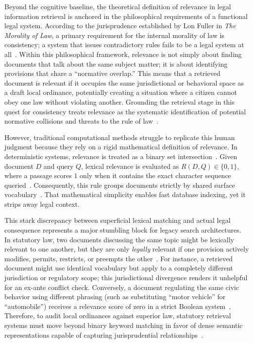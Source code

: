     Beyond the cognitive baseline, the theoretical definition of relevance in legal information retrieval is anchored in the philosophical requirements of a functional legal system. According to the jurisprudence established by Lon Fuller in \textit{The Morality of Law}, a primary requirement for the internal morality of law is consistency; a system that issues contradictory rules fails to be a legal system at all~\cite{fuller1964the}. Within this philosophical framework, relevance is not simply about finding documents that talk about the same subject matter; it is about identifying provisions that share a ``normative overlap.'' This means that a retrieved document is relevant if it occupies the same jurisdictional or behavioral space as a draft local ordinance, potentially creating a situation where a citizen cannot obey one law without violating another. Grounding the retrieval stage in this quest for consistency treats relevance as the systematic identification of potential normative collisions and threats to the rule of law~\cite{fuller1964the}.

    However, traditional computational methods struggle to replicate this human judgment because they rely on a rigid mathematical definition of relevance. In deterministic systems, relevance is treated as a binary set intersection~\cite{blair1985an}. Given document $D$ and query $Q$, lexical relevance is evaluated as $R(D,Q) \in \{0,1\}$, where a passage scores $1$ only when it contains the exact character sequence queried~\cite{opijnen2017on}. Consequently, this rule groups documents strictly by shared surface vocabulary~\cite{blair1985an}. That mathematical simplicity enables fast database indexing, yet it strips away legal context.

    This stark discrepancy between superficial lexical matching and actual legal consequence represents a major stumbling block for legacy search architectures. In statutory law, two documents discussing the same topic might be lexically relevant to one another, but they are only \textit{legally} relevant if one provision actively modifies, permits, restricts, or preempts the other~\cite{opijnen2017on}. For instance, a retrieved document might use identical vocabulary but apply to a completely different jurisdiction or regulatory scope; this jurisdictional divergence renders it unhelpful for an ex-ante conflict check. Conversely, a document regulating the same civic behavior using different phrasing (such as substituting ``motor vehicle'' for ``automobile'') receives a relevance score of zero in a strict Boolean system~\cite{blair1985an}. Therefore, to audit local ordinances against superior law, statutory retrieval systems must move beyond binary keyword matching in favor of dense semantic representations capable of capturing jurisprudential relationships~\cite{kim2024legal}.

